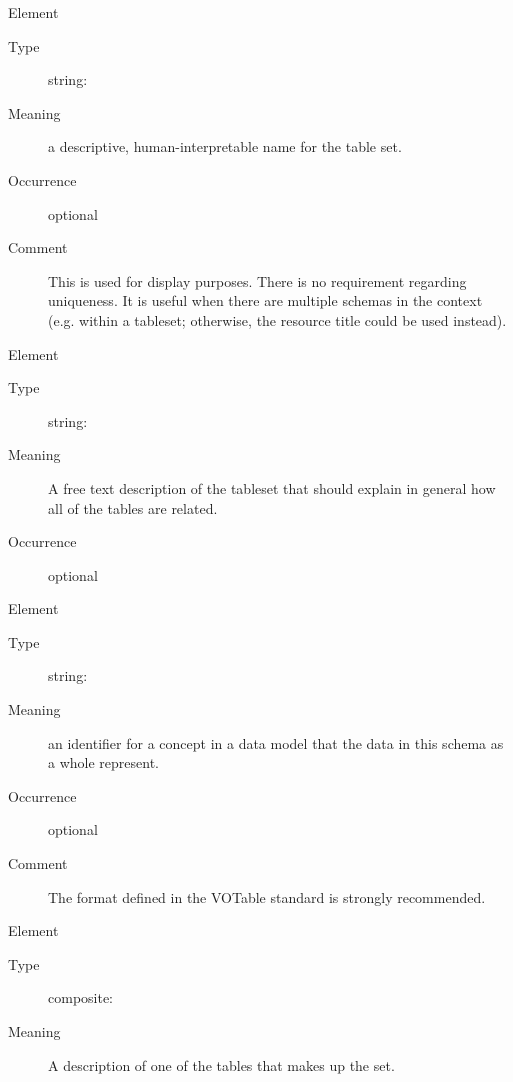 \documentclass[11pt,a4paper]{ivoa}
\begin{document}
\begin{generated}
\begin{bigdescription}
\begin{description}
\end{description}
\item[Element \xmlel{title}]
\begin{description}
\item[Type] string: 
\item[Meaning] 
                  a descriptive, human-interpretable name for the table set.
               
\item[Occurrence] optional
\item[Comment] 
                  This is used for display purposes.  There is no requirement
                  regarding uniqueness.  It is useful when there are
                  multiple schemas in the context (e.g. within a
                  tableset; otherwise, the resource title could be
                  used instead).
               

\end{description}
\item[Element \xmlel{description}]
\begin{description}
\item[Type] string: 
\item[Meaning] 
               A free text description of the tableset that should
               explain in general how all of the tables are related.
             
\item[Occurrence] optional

\end{description}
\item[Element \xmlel{utype}]
\begin{description}
\item[Type] string: 
\item[Meaning] 
                  an identifier for a concept in a data model that
                  the data in this schema as a whole represent.  
               
\item[Occurrence] optional
\item[Comment] 
                  The format defined in the VOTable standard is strongly
                  recommended. 
               

\end{description}
\item[Element \xmlel{table}]
\begin{description}
\item[Type] composite: 
\item[Meaning] 
               A description of one of the tables that makes up the set.
             

\end{description}
\end{bigdescription}
\end{generated}
\end{document}
